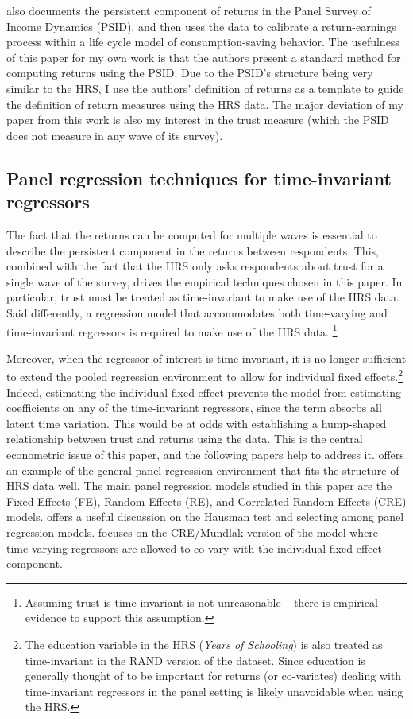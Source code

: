 \par \cite{Daminato2024} also documents the persistent component of returns in the Panel Survey of Income Dynamics (PSID), and then uses the data to calibrate a return-earnings process within a life cycle model of consumption-saving behavior. The usefulness of this paper for my own work is that the authors present a standard method for computing returns using the PSID. Due to the PSID's structure being very similar to the HRS, I use the authors' definition of returns as a template to guide the definition of return measures using the HRS data. The major deviation of my paper from this work is also my interest in the trust measure (which the PSID does not measure in any wave of its survey).

\subsection{Panel regression techniques for time-invariant regressors}

\par The fact that the returns can be computed for multiple waves is essential to describe the persistent component in the returns between respondents. This, combined with the fact that the HRS only asks respondents about trust for a single wave of the survey, drives the empirical techniques chosen in this paper. In particular, trust must be treated as time-invariant to make use of the HRS data. Said differently, a regression model that accommodates both time-varying and time-invariant regressors is required to make use of the HRS data. \footnote{Assuming trust is time-invariant is not unreasonable -- there is empirical evidence to support this assumption.} 

\par Moreover, when the regressor of interest is time-invariant, it is no longer sufficient to extend the pooled regression environment to allow for individual fixed effects.\footnote{The education variable in the HRS (\textit{Years of Schooling}) is also treated as time-invariant in the RAND version of the dataset. Since education is generally thought of to be important for returns (or co-variates) dealing with time-invariant regressors in the panel setting is likely unavoidable when using the HRS.} Indeed, estimating the individual fixed effect prevents the model from estimating coefficients on any of the time-invariant regressors, since the term absorbs all latent time variation. This would be at odds with establishing a hump-shaped relationship between trust and returns using the data. This is the central econometric issue of this paper, and the following papers help to address it. \cite{BaltagiLiu2026Mundlak} offers an example of the general panel regression environment that fits the structure of HRS data well. The main panel regression models studied in this paper are the Fixed Effects (FE), Random Effects (RE), and Correlated Random Effects (CRE) models. \cite{Wooldridge2019CRE} offers a useful discussion on the Hausman test and selecting among panel regression models. \cite{BollenBrand2010} focuses on the CRE/Mundlak version of the model where time-varying regressors are allowed to co-vary with the individual fixed effect component. 
